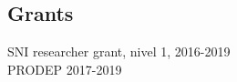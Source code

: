 \documentclass[overlapped,line,letterpaper]{res}
\begin{document}
\begin{resume}
\section {\cs Grants}
SNI researcher grant, nivel 1, 2016-2019 \\
PRODEP 2017-2019
\end{resume}
\end{document}
